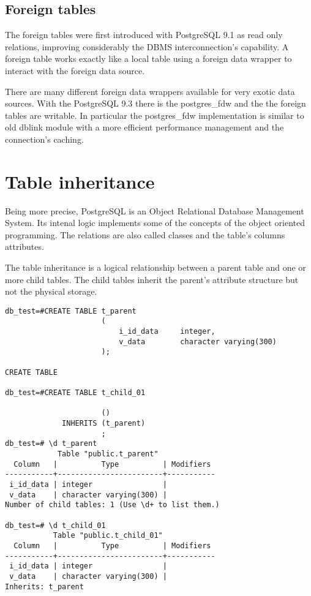 \subsection{Foreign tables}
The foreign tables were first introduced with PostgreSQL 9.1 as read only relations, improving 
considerably the DBMS interconnection's capability. A foreign table works exactly like a local table 
using a foreign data
wrapper to interact with the foreign data source.\newline

There are many different foreign data wrappers available for very exotic data sources. With the 
PostgreSQL 9.3 there is the postgres\_fdw and the the foreign tables are writable. In particular 
the postgres\_fdw implementation is similar to old dblink module with a more efficient performance 
management and the connection's caching.

\section{Table inheritance}
Being more precise, PostgreSQL is an Object Relational Database Management System. Its intenal logic
implements some of the concepts of the object oriented programming. The relations are also called 
classes and the table's columns attributes. \newline

The table inheritance is a logical relationship between a parent table and one or more child 
tables. The child tables inherit the parent's attribute structure but not the physical storage. 

\begin{lstlisting}[style=pgsql]
db_test=#CREATE TABLE t_parent
                      (
                          i_id_data     integer,
                          v_data        character varying(300)
                      );

CREATE TABLE                     

db_test=#CREATE TABLE t_child_01
                      
                      ()
             INHERITS (t_parent)
                      ;                      
db_test=# \d t_parent
            Table "public.t_parent"
  Column   |          Type          | Modifiers 
-----------+------------------------+-----------
 i_id_data | integer                | 
 v_data    | character varying(300) | 
Number of child tables: 1 (Use \d+ to list them.)

db_test=# \d t_child_01 
           Table "public.t_child_01"
  Column   |          Type          | Modifiers 
-----------+------------------------+-----------
 i_id_data | integer                | 
 v_data    | character varying(300) | 
Inherits: t_parent

\end{lstlisting}

